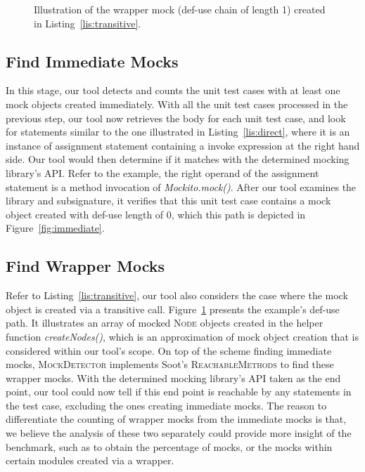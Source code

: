 \begin{figure}
	\centering
	
	\caption{Illustration of the wrapper mock (def-use chain of length 1) created in Listing~\ref{lis:transitive}.}
	\label{fig:wrapper}
\end{figure}

\subsection{Find Immediate Mocks}
\label{subsec:immediate}

In this stage, our tool detects and counts the unit test cases with at least one mock objects created immediately. With all the unit test cases processed in the previous step, our tool now retrieves the body for each unit test case, and look for statements similar to the one illustrated in Listing~\ref{lis:direct}, where it is an instance of assignment statement containing a invoke expression at the right hand side. Our tool would then determine if it matches with the determined mocking library's API. Refer to the example, the right operand of the assignment statement is a method invocation of \textit{Mockito.mock()}. After our tool examines the library and subsignature, it verifies that this unit test case contains a mock object created with def-use length of 0, which this path is depicted in Figure~\ref{fig:immediate}. 


\subsection{Find Wrapper Mocks}
\label{subsec:wrapper}

Refer to Listing~\ref{lis:transitive}, our tool also considers the case where the mock object is created via a transitive call. Figure~\ref{fig:wrapper} presents the example's def-use path. It illustrates an array of mocked \textsc{Node} objects created in the helper function \textit{createNodes()}, which is an approximation of mock object creation that is considered within our tool's scope. 
On top of the scheme finding immediate mocks, \textsc{MockDetector} implements Soot's \textsc{ReachableMethods} to find these wrapper mocks. With the determined mocking library's API taken as the end point, our tool could now tell if this end point is reachable by any statements in the test case, excluding the ones creating immediate mocks.
The reason to differentiate the counting of wrapper mocks from the immediate mocks is that, we believe the analysis of these two separately could provide more insight of the benchmark, such as to obtain the percentage of mocks, or the mocks within certain modules created via a wrapper.

